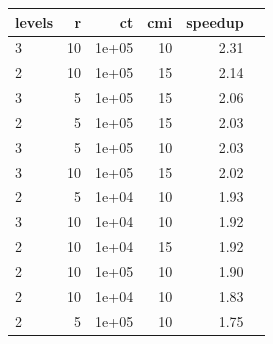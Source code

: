 \begin{tabular}{l|rrrrr}
\hline
levels & r & ct & cmi & speedup \\
\hline
3 & 10 & 1e+05 & 10 & 2.31 \\
2 & 10 & 1e+05 & 15 & 2.14 \\
3 & 5 & 1e+05 & 15 & 2.06 \\
2 & 5 & 1e+05 & 15 & 2.03 \\
3 & 5 & 1e+05 & 10 & 2.03 \\
3 & 10 & 1e+05 & 15 & 2.02 \\
2 & 5 & 1e+04 & 10 & 1.93 \\
3 & 10 & 1e+04 & 10 & 1.92 \\
2 & 10 & 1e+04 & 15 & 1.92 \\
2 & 10 & 1e+05 & 10 & 1.90 \\
2 & 10 & 1e+04 & 10 & 1.83 \\
2 & 5 & 1e+05 & 10 & 1.75 \\
\hline
\end{tabular}
